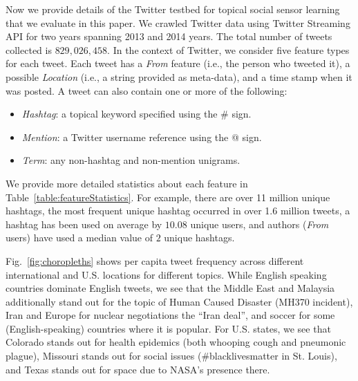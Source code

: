 Now we provide details of the Twitter testbed for topical social sensor learning
that we evaluate in this paper.  We crawled Twitter data using Twitter
Streaming API for two years spanning 2013 and 2014 years.
The total number of tweets collected is $829,026,458$. In the context
of Twitter, we consider five feature types for each tweet.  Each
tweet has a \textit{From} feature (i.e., the person who tweeted it), a
possible \textit{Location} (i.e., a string provided as meta-data), and
a time stamp when it was posted.  A tweet can also contain one or more
of the following:
\begin{itemize}
\item \textit{Hashtag}: a topical keyword specified using the \# sign.
\item \textit{Mention}: a Twitter username reference using the @ sign. %
\item \textit{Term}:    any non-hashtag and non-mention unigrams. %
\end{itemize}
We provide more detailed statistics about each feature in
Table~\ref{table:featureStatistics}.  For example, there are
over 11 million unique hashtags, the most frequent unique hashtag
occurred in over 1.6 million tweets,
a hashtag has been used on average by $10.08$ unique users, and 
authors (\textit{From} users) have used a median value of $2$
unique hashtags. %

Fig.~\ref{fig:choropleths} shows per capita tweet frequency across
different international and U.S. locations for different topics.
While English speaking countries dominate English tweets, we see that
the Middle East and Malaysia additionally stand out for the topic of
Human Caused Disaster (MH370 incident), Iran and Europe for nuclear
negotiations the ``Iran deal'', and soccer for some (English-speaking)
countries where it is popular.  For U.S. states, we see that Colorado
stands out for health epidemics (both whooping cough and pneumonic
plague), Missouri stands out for social issues (\#blacklivesmatter in
St. Louis), and Texas stands out for space due to NASA's presence
there.

